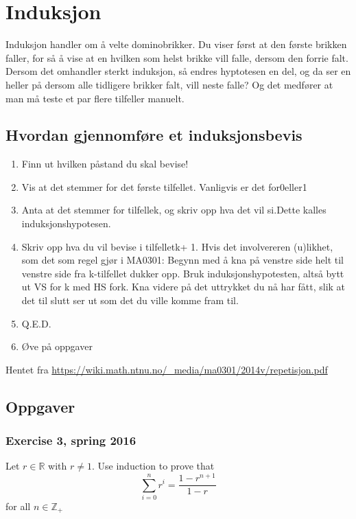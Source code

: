 \section{Induksjon}

Induksjon handler om å velte dominobrikker. Du viser først at den første brikken faller, for så å vise at en hvilken som helst brikke vill falle, dersom den forrie falt.
Dersom det omhandler sterkt induksjon, så endres hyptotesen en del, og da ser en heller på dersom alle tidligere brikker falt, vill neste falle? Og det medfører at man må teste et par flere tilfeller manuelt.

\subsection{Hvordan gjennomføre et induksjonsbevis}
\begin{enumerate}
    \item Finn ut hvilken påstand du skal bevise!
    \item Vis at det stemmer for det første tilfellet. Vanligvis er det for0eller1
    \item Anta at det stemmer for tilfellek, og skriv opp hva det vil si.Dette kalles induksjonshypotesen.
    \item Skriv opp hva du vil bevise i tilfelletk+ 1. Hvis det involvereren (u)likhet, som det som regel gjør i MA0301: Begynn med å kna på venstre side helt til venstre side fra k-tilfellet dukker opp. Bruk induksjonshypotesten, altså bytt ut VS for k med HS fork. Kna videre på det uttrykket du nå har fått, slik at det til slutt ser ut som det du ville komme fram til.
    \item Q.E.D.
    \item Øve på oppgaver
\end{enumerate}

Hentet fra \url{https://wiki.math.ntnu.no/_media/ma0301/2014v/repetisjon.pdf}

\subsection{Oppgaver}

\subsubsection{Exercise 3, spring 2016}
Let $r\in\mathbb{R}$ with $r\neq 1$. Use induction to prove that
\[
\sum_{i=0}^{n}r^i = \frac{1-r^{n+1}}{1-r}    
\]
for all $n\in \mathbb{Z}_+$

